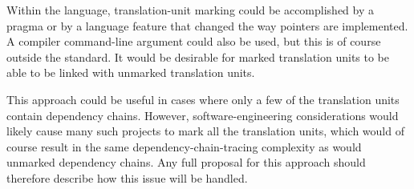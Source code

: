 Within the language, translation-unit marking could be accomplished by
a pragma or by a language feature that changed the way pointers are
implemented.
A compiler command-line argument could also be used, but this is of
course outside the standard.
It would be desirable for marked translation units to be able to
be linked with unmarked translation units.

This approach could be useful in cases where only a few of the translation
units contain dependency chains.
However, software-engineering considerations would likely cause many such
projects to mark all the translation units, which would of course result
in the same dependency-chain-tracing complexity as would unmarked
dependency chains.
Any full proposal for this approach should therefore describe how this
issue will be handled.
